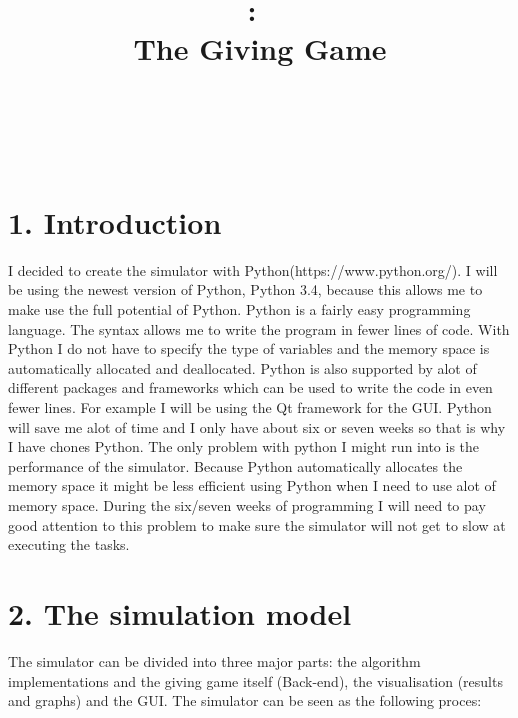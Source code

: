 \documentclass{article}
\title{
\vspace{2in}
\textmd{\textbf{\hmwkClass:\ \hmwkTitle}}\\
\textmd{The Giving Game}\\
\normalsize\vspace{0.1in}\small{\hmwkDueDate}\\
\vspace{0.1in}\large{\textit{\hmwkClassInstructor\ \hmwkClassTime}}
\vspace{3in}
}
\author{\textbf{\hmwkAuthorName}}
\date{} %
\begin{document}
\maketitle



\newpage
\tableofcontents
\newpage



\section{1. Introduction}
I decided to create the simulator with Python(https://www.python.org/). I will be using the newest version of Python, Python 3.4, because this allows me to make use the full potential of Python.  Python is a fairly easy programming language. The syntax allows me to write the program in fewer lines of code.  With Python I do not have to specify the type of variables and the memory space is automatically allocated and deallocated. Python is also supported by alot of different packages and frameworks which can be used to write the code in even fewer lines. For example I will be using the Qt framework for the GUI. Python will save me alot of time and I only have about six or seven weeks so that is why I have chones Python. The only problem with python I might run into is the performance of the simulator. Because Python automatically allocates the memory space it might be less efficient using Python when I need to use alot of memory space. During the six/seven weeks of programming I will need to pay good attention to this problem to make sure the simulator will not get to slow at executing the tasks.

\section{2. The simulation model}
The simulator can be divided into three major parts: the algorithm implementations and the giving game itself (Back-end), the visualisation (results and graphs) and the GUI. The simulator can be seen as the following proces:
\end{document}
